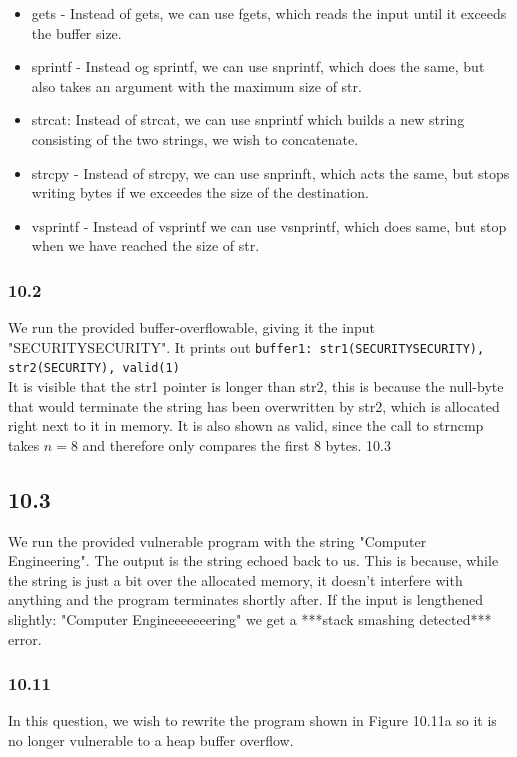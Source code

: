 \documentclass{article}
\begin{document}
\begin{itemize}
    \item gets - Instead of gets, we can use fgets, which reads the input until it exceeds the buffer size.
    \item sprintf - Instead og sprintf, we can use snprintf, which does the same, but also takes an argument with the maximum size of str. 
    \item strcat: Instead of strcat, we can use snprintf which builds a new string consisting of the two strings, we wish to concatenate. 
    \item strcpy - Instead of strcpy, we can use snprinft, which acts the same, but stops writing bytes if we exceedes the size of the destination. 
    \item vsprintf - Instead of vsprintf we can use vsnprintf, which does same, but stop when we have reached the size of str.
\end{itemize}

\subsubsection{10.2} 
We run the provided buffer-overflowable, giving it the input "SECURITYSECURITY".
It prints out \verb!buffer1: str1(SECURITYSECURITY), str2(SECURITY), valid(1)!\\
It is visible that the str1 pointer is longer than str2, this is because the
null-byte that would terminate the string has been overwritten by str2, which is
allocated right next to it in memory. It is also shown as valid, since the call
to strncmp takes $n=8$ and therefore only compares the first 8 bytes.
10.3

\subsection{10.3}
We run the provided vulnerable program with the string "Computer Engineering". The
output is the string echoed back to us. This is because, while the string is just a
bit over the allocated memory, it doesn't interfere with anything and the program
terminates shortly after. If the input is lengthened slightly: "Computer Engineeeeeeering" we get a ***stack smashing detected*** error.

\subsubsection{10.11}
In this question, we wish to rewrite the program shown in Figure 10.11a so it is no longer vulnerable to a heap buffer overflow.
\end{document}
